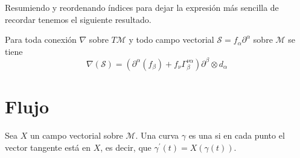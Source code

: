 Resumiendo y reordenando índices para dejar la expresión más sencilla de recordar tenemos el siguiente resultado.
\begin{proposition}
  Para toda conexión $\nabla$ sobre $T\mathcal{M}$ y todo campo vectorial $\mathcal{S}=f_\alpha\partial^\alpha$
  sobre $\mathcal{\mathcal{M}}$ se tiene
  \begin{equation}
    \label{eq:conexion-coordenadas}
    \nabla(\mathcal{S}) = (\partial^\alpha(f_\beta)+f_\nu\Gamma_\beta^{\nu\alpha})\partial^\beta\otimes d_\alpha
  \end{equation}
\end{proposition}

\section{Flujo}\label{sec:flujo}
\begin{definition}
  Sea $X$ un campo vectorial sobre $\mathcal{M}$.
  Una curva $\gamma$ es una  si en cada punto el vector tangente está en $X$, es decir, que $\gamma^{'}(t)=X(\gamma(t))$.
\end{definition}

